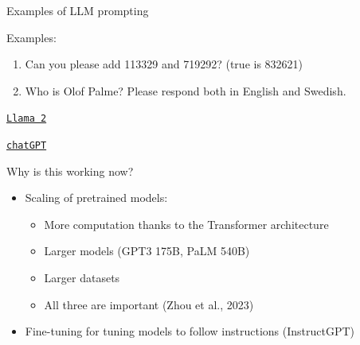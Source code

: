\documentclass[10pt]{beamer}
\begin{document}
\begin{frame}{Examples of LLM prompting}

Examples:
\begin{enumerate}
\item Can you please add 113329 and 719292? (true is 832621)
\item Who is Olof Palme? Please respond both in English and Swedish.
\end{enumerate}

\centering

\vspace{5mm}

\href{https://www.llama2.ai/}{\texttt{Llama 2}}

\vspace{10mm}

\href{https://chat.openai.com/}{\texttt{chatGPT}}

\end{frame}


\begin{frame}{Why is this working now?}

\begin{itemize}
\item Scaling of pretrained models:
\begin{itemize}
\item More computation thanks to the Transformer architecture
\item Larger models (GPT3 175B, PaLM 540B)
\item Larger datasets
\item All three are important (Zhou et al., 2023)\\
\end{itemize}
\pause
\item Fine-tuning for tuning models to follow instructions (InstructGPT)
\end{itemize}

\end{frame}




\end{document}
